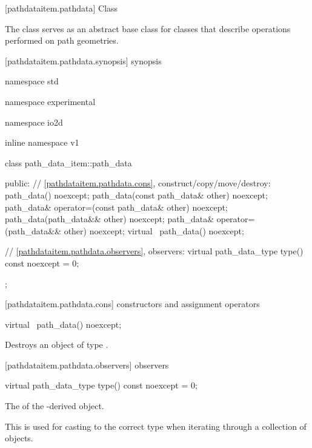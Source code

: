  [pathdataitem.pathdata] {Class }

\pnum
{}
The class  serves as an abstract base class for classes that describe operations performed on path geometries.

 [pathdataitem.pathdata.synopsis] { synopsis}

\begin{codeblock}
namespace std { namespace experimental { namespace io2d { inline namespace v1 {
  class path_data_item::path_data {
  public:
    // \ref{pathdataitem.pathdata.cons}, construct/copy/move/destroy:
    path_data() noexcept;
    path_data(const path_data& other) noexcept;
    path_data& operator=(const path_data& other) noexcept;
    path_data(path_data&& other) noexcept;
    path_data& operator=(path_data&& other) noexcept;
    virtual ~path_data() noexcept;

    // \ref{pathdataitem.pathdata.observers}, observers:
    virtual path_data_type type() const noexcept = 0;
  };
} } } }
\end{codeblock}

 [pathdataitem.pathdata.cons] { constructors and assignment operators}

\begin{itemdecl}
    virtual ~path_data() noexcept;
\end{itemdecl}
\begin{itemdescr}
	\pnum
	\effects
	Destroys an object of type .
	
\end{itemdescr}

 [pathdataitem.pathdata.observers]{ observers}

\begin{itemdecl}
    virtual path_data_type type() const noexcept = 0;
\end{itemdecl}
\begin{itemdescr}
	\pnum
	\returns
	The  of the -derived object.
	
	\pnum
	\realnote
	This is used for casting to the correct type when iterating through a collection of  objects.
\end{itemdescr}
